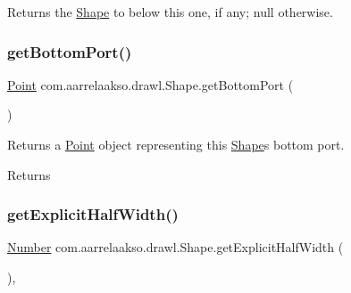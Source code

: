 \begin{DoxyReturn}{Returns}
the \hyperlink{classcom_1_1aarrelaakso_1_1drawl_1_1_shape}{Shape} to below this one, if any; {\ttfamily null} otherwise. 
\end{DoxyReturn}
\mbox{\label{classcom_1_1aarrelaakso_1_1drawl_1_1_shape_aba14efe9a16c0808580963c66b171082}} 
\subsubsection{\texorpdfstring{get\+Bottom\+Port()}{getBottomPort()}}
{\footnotesize\ttfamily \hyperlink{classcom_1_1aarrelaakso_1_1drawl_1_1_point}{Point} com.\+aarrelaakso.\+drawl.\+Shape.\+get\+Bottom\+Port (\begin{DoxyParamCaption}{ }\end{DoxyParamCaption})\hspace{0.3cm}{\ttfamily [inherited]}}



Returns a \hyperlink{classcom_1_1aarrelaakso_1_1drawl_1_1_point}{Point} object representing this \hyperlink{classcom_1_1aarrelaakso_1_1drawl_1_1_shape}{Shape}\textquotesingle{}s bottom port. 

\begin{DoxyReturn}{Returns}

\end{DoxyReturn}
\mbox{\label{classcom_1_1aarrelaakso_1_1drawl_1_1_shape_a3acdc2fd1944e2efacd0bfbb8aefe89b}} 
\subsubsection{\texorpdfstring{get\+Explicit\+Half\+Width()}{getExplicitHalfWidth()}}
{\footnotesize\ttfamily \hyperlink{interfacecom_1_1aarrelaakso_1_1drawl_1_1_number}{Number} com.\+aarrelaakso.\+drawl.\+Shape.\+get\+Explicit\+Half\+Width (\begin{DoxyParamCaption}{ }\end{DoxyParamCaption})\hspace{0.3cm}{\ttfamily [protected]}, {\ttfamily [inherited]}}



